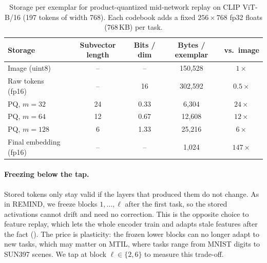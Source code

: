 \begin{table}[h]
\centering
\caption{Storage per exemplar for product-quantized mid-network replay on CLIP ViT-B/16 (197 tokens of width 768). Each codebook adds a fixed $256 \times 768$ fp32 floats (768\,KB) per task.}
\label{tab:pq_m}
\begin{tabular}{lcccc}
\toprule
Storage & Subvector length & Bits / dim & Bytes / exemplar & vs.\ image \\
\midrule
Image (uint8)         & --  & --   & 150{,}528 & $1\times$ \\
Raw tokens (fp16)     & --  & 16   & 302{,}592 & $0.5\times$ \\
PQ, $m=32$            & 24  & 0.33 & 6{,}304   & $24\times$ \\
PQ, $m=64$            & 12  & 0.67 & 12{,}608  & $12\times$ \\
PQ, $m=128$           & 6   & 1.33 & 25{,}216  & $6\times$ \\
Final embedding (fp16)& --  & --   & 1{,}024   & $147\times$ \\
\bottomrule
\end{tabular}
\end{table}

\paragraph{Freezing below the tap.} Stored tokens only stay valid if the layers that produced them do not change. As in REMIND, we freeze blocks $1, \dots, \ell$ after the first task, so the stored activations cannot drift and need no correction. This is the opposite choice to feature replay, which lets the whole encoder train and adapts stale features after the fact (). The price is plasticity: the frozen lower blocks can no longer adapt to new tasks, which may matter on MTIL, where tasks range from MNIST digits to SUN397 scenes. We tap at block $\ell \in \{2, 6\}$ to measure this trade-off.

